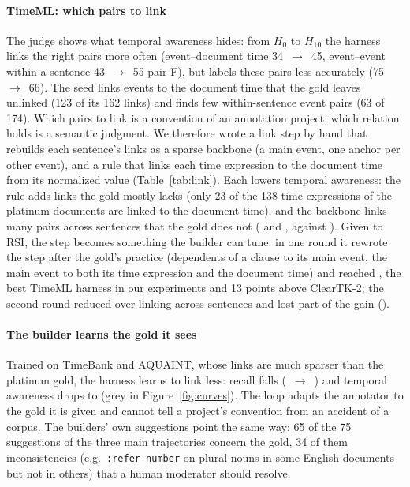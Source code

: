 \paragraph{TimeML: which pairs to link}\label{sec:link} The judge shows what temporal awareness hides: from $H_0$ to $H_{10}$ the harness links the right pairs more often (event--document time 34~$\rightarrow$~45, event--event within a sentence 43~$\rightarrow$~55 pair F), but labels these pairs less accurately (75~$\rightarrow$~66). The seed links events to the document time that the gold leaves unlinked (123 of its 162 links) and finds few within-sentence event pairs (63 of 174). Which pairs to link is a convention of an annotation project; which relation holds is a semantic judgment. We therefore wrote a link step by hand that rebuilds each sentence's links as a sparse backbone (a main event, one anchor per other event), and a rule that links each time expression to the document time from its normalized value (Table~\ref{tab:link}). Each lowers temporal awareness: the rule adds links the gold mostly lacks (only 23 of the 138 time expressions of the platinum documents are linked to the document time), and the backbone links many pairs across sentences that the gold does not (\lnkLink{} and \lnkLinkTwo{}, against \lnkSeed{}). Given to RSI, the step becomes something the builder can tune: in one round it rewrote the step after the gold's practice (dependents of a clause to its main event, the main event to both its time expression and the document time) and reached \lnkLinkRsiOne{}, the best TimeML harness in our experiments and 13 points above ClearTK-2; the second round reduced over-linking across sentences and lost part of the gain (\lnkLinkRsiTwo{}).

\paragraph{The builder learns the gold it sees} Trained on TimeBank and AQUAINT, whose links are much sparser than the platinum gold, the harness learns to link less: recall falls (\tlinkrSeedTml{}~$\rightarrow$~\altTlinkRLearnedTml{}) and temporal awareness drops to \altTlinkLearnedTml{} (grey in Figure~\ref{fig:curves}). The loop adapts the annotator to the gold it is given and cannot tell a project's convention from an accident of a corpus. The builders' own suggestions point the same way: 65 of the 75 suggestions of the three main trajectories concern the gold, 34 of them inconsistencies (e.g.\ \texttt{:refer-number} on plural nouns in some English documents but not in others) that a human moderator should resolve.

